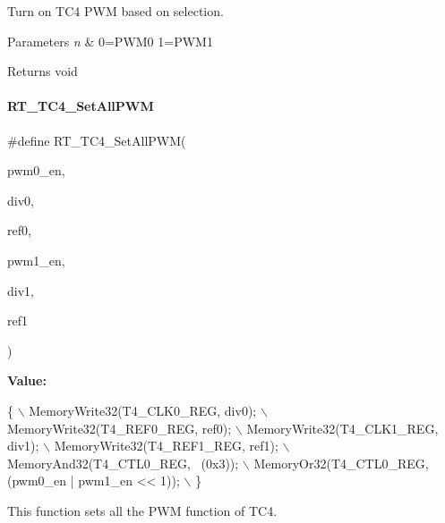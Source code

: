 Turn on T\+C4 P\+WM based on selection. 


\begin{DoxyParams}{Parameters}
{\em n} & 0=P\+W\+M0 1=P\+W\+M1 \\
\hline
\end{DoxyParams}
\begin{DoxyReturn}{Returns}
void 
\end{DoxyReturn}
\mbox{\label{a00050_ad6b804bb230129a442fe9ce55e3bd2f6}} 
\paragraph{\texorpdfstring{R\+T\+\_\+\+T\+C4\+\_\+\+Set\+All\+P\+WM}{RT\_TC4\_SetAllPWM}}
{\footnotesize\ttfamily \#define R\+T\+\_\+\+T\+C4\+\_\+\+Set\+All\+P\+WM(\begin{DoxyParamCaption}\item[{}]{pwm0\+\_\+en,  }\item[{}]{div0,  }\item[{}]{ref0,  }\item[{}]{pwm1\+\_\+en,  }\item[{}]{div1,  }\item[{}]{ref1 }\end{DoxyParamCaption})}

{\bfseries Value\+:}
\begin{DoxyCode}
\{                                                           \(\backslash\)
        MemoryWrite32(T4\_CLK0\_REG, div0);                       \(\backslash\)
        MemoryWrite32(T4\_REF0\_REG, ref0);                       \(\backslash\)
        MemoryWrite32(T4\_CLK1\_REG, div1);                       \(\backslash\)
        MemoryWrite32(T4\_REF1\_REG, ref1);                       \(\backslash\)
        MemoryAnd32(T4\_CTL0\_REG, ~(0x3));                       \(\backslash\)
        MemoryOr32(T4\_CTL0\_REG, (pwm0\_en | pwm1\_en << 1));      \(\backslash\)
    \}
\end{DoxyCode}


This function sets all the P\+WM function of T\+C4. 


